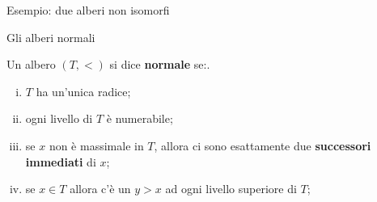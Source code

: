\documentclass{beamer}
\theoremstyle{num.custom-title}
\theoremstyle{custom-title}
\DeclareMathOperator{\down}{\downarrow}
\renewcommand{\L}{\mathcal{L}}
\renewcommand{\emph}[1]{\textbf{#1}}
\begin{document}
\begin{frame}{Esempio: due alberi non isomorfi}



\end{frame}


\begin{frame}{Gli alberi normali}

\begin{definition}
Un albero $(T,<)$ si dice \emph{normale} se:.
\begin{enumerate}[(i)]
\item $T$ ha un'unica radice;
\item ogni livello di $T$ è numerabile;
\item se $x$ non è massimale in $T$, allora ci sono esattamente due \emph{successori immediati} di $x$;
\item se $x \in T$ allora c'è un $y>x$ ad ogni livello superiore di $T$;
\end{enumerate}
\end{definition}

\end{frame}
\end{document}

